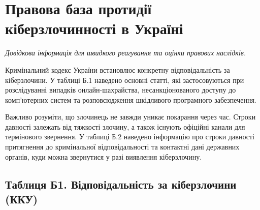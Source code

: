 ﻿\chapter{Правова база протидії кіберзлочинності в Україні}
\label{apdx:legal}

\noindent\textit{Довідкова інформація для швидкого реагування та оцінки правових наслідків.}

\vspace{0.5cm}

Кримінальний кодекс України встановлює конкретну відповідальність за кіберзлочини. У таблиці Б.1 наведено основні статті, які застосовуються при розслідуванні випадків онлайн-шахрайства, несанкціонованого доступу до комп'ютерних систем та розповсюдження шкідливого програмного забезпечення.

Важливо розуміти, що злочинець не завжди уникає покарання через час. Строки давності залежать від тяжкості злочину, а також існують офіційні канали для термінового звернення. У таблиці Б.2 наведено інформацію про строки давності притягнення до кримінальної відповідальності та контактні дані державних органів, куди можна звернутися у разі виявлення кіберзлочину.



\section*{Таблиця Б1. Відповідальність за кіберзлочини (ККУ)}

